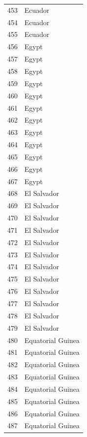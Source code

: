 \documentclass[
  letterpaper,
  DIV=11,
  numbers=noendperiod]{scrreprt}
\begin{document}
\begin{tabular}{ll}
453  &                   Ecuador \\
454  &                   Ecuador \\
455  &                   Ecuador \\
456  &                     Egypt \\
457  &                     Egypt \\
458  &                     Egypt \\
459  &                     Egypt \\
460  &                     Egypt \\
461  &                     Egypt \\
462  &                     Egypt \\
463  &                     Egypt \\
464  &                     Egypt \\
465  &                     Egypt \\
466  &                     Egypt \\
467  &                     Egypt \\
468  &               El Salvador \\
469  &               El Salvador \\
470  &               El Salvador \\
471  &               El Salvador \\
472  &               El Salvador \\
473  &               El Salvador \\
474  &               El Salvador \\
475  &               El Salvador \\
476  &               El Salvador \\
477  &               El Salvador \\
478  &               El Salvador \\
479  &               El Salvador \\
480  &         Equatorial Guinea \\
481  &         Equatorial Guinea \\
482  &         Equatorial Guinea \\
483  &         Equatorial Guinea \\
484  &         Equatorial Guinea \\
485  &         Equatorial Guinea \\
486  &         Equatorial Guinea \\
487  &         Equatorial Guinea \\

\end{tabular}
\end{document}
